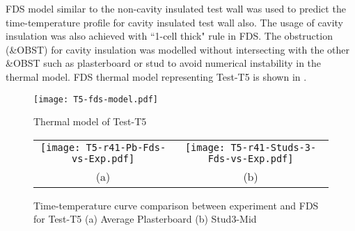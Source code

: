 FDS model similar to the non-cavity insulated test wall was used to predict the time-temperature profile for cavity insulated test wall also. The usage of cavity insulation was also achieved with ``1-cell thick" rule in FDS. The obstruction (\&OBST) for cavity insulation was modelled without intersecting with the other \&OBST such as plasterboard or stud to avoid numerical instability in the thermal model. FDS thermal model representing Test-T5 is shown in .
\begin{figure}[!htbp]
	\centering
		\texttt{[image: T5-fds-model.pdf]}
		\caption{Thermal model of Test-T5}
		\label{fig:T5-fds-model-cavity}
\end{figure}
\begin{figure}[!htbp]
	\centering
		\begin{tabular}{cc}
			\texttt{[image: T5-r41-Pb-Fds-vs-Exp.pdf]} & \texttt{[image: T5-r41-Studs-3-Fds-vs-Exp.pdf]} \\
			(a) & (b) \\
		\end{tabular} 
		\caption{Time-temperature curve comparison between experiment and FDS for Test-T5 (a) Average Plasterboard (b) Stud3-Mid}
		\label{fig:fds-output-pb-studs-t5}
\end{figure}

